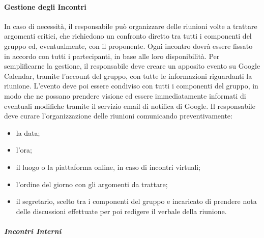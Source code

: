		\paragraph{Gestione degli Incontri}
		
			In caso di necessità, il responsabile può organizzare delle riunioni volte a trattare argomenti critici, che richiedono un confronto diretto tra tutti i componenti del gruppo ed, eventualmente, con il proponente.
			\newline
			Ogni incontro dovrà essere fissato in accordo con tutti i partecipanti, in base alle loro disponibilità. Per semplificarne la gestione, il responsabile deve creare un apposito evento su Google Calendar, tramite l'account del gruppo, con tutte le informazioni riguardanti la riunione. L'evento deve poi essere condiviso con tutti i componenti del gruppo, in modo che ne possano prendere visione ed essere immediatamente informati di eventuali modifiche tramite il servizio email di notifica di Google.
			\newline
			Il responsabile deve curare l'organizzazione delle riunioni comunicando preventivamente:
			
			\begin{itemize}
				\item la data;
				\item l'ora;
				\item il luogo o la piattaforma online, in caso di incontri virtuali;
				\item l'ordine del giorno con gli argomenti da trattare;
				\item il segretario, scelto tra i componenti del gruppo e incaricato di prendere nota delle discussioni effettuate per poi redigere il verbale della riunione.
			\end{itemize}
		
			\subparagraph{Incontri Interni}
			

